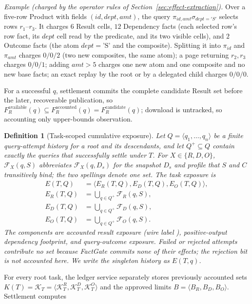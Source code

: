 \documentclass[10pt,journal,compsoc]{IEEEtran}
\newcommand{\system}{FactGate\xspace}
\newcommand{\code}[1]{\texttt{\detokenize{#1}}}
\newcommand{\facts}{\mathcal{F}}
\newcommand{\accounted}{\mathcal{K}}
\newtheorem{definition}{Definition}
\begin{document}
\emph{Example (charged by the operator rules of Section~\ref{sec:effect-extraction}).} Over a five-row Product with fields $(id,dept,amt)$, the
query $\pi_{id,amt}\sigma_{dept='S'}$ selects rows $r_1$--$r_3$. It charges
$6$ Result cells, $12$ Dependency facts (each selected row's row fact, its
$dept$ cell read by the predicate, and its two visible cells), and $2$
Outcome facts (the atom $dept{=}\text{'S'}$ and the composite). Splitting it
into $\pi_{id}$ and $\pi_{amt}$ charges $0/0/2$ (two new composites, the same
atom); a page returning $r_2,r_3$ charges $0/0/1$; adding $amt>5$ charges
one new atom and one composite and no new base facts; an exact replay by the
root or by a delegated child charges $0/0/0$.

For a successful $q$, settlement commits the complete candidate Result set
before the later, recoverable publication, so
$F_R^{\mathrm{available}}(q)\subseteq F_R^{\mathrm{accounted}}(q)
=F_R^{\mathrm{candidate}}(q)$; download is untracked, so accounting only
upper-bounds observation.

\begin{definition}[Task-scoped cumulative exposure]
\label{def:task-exposure}
Let $Q=\langle q_1,\ldots,q_n\rangle$ be a finite query-attempt history for a
root and its descendants, and let $Q^+\subseteq Q$ contain exactly the queries
that successfully settle under $T$. For $X\in\{R,D,O\}$,
$\facts_X(q,S)$ abbreviates $\facts_X(q,D_s)$ for the snapshot $D_s$ and
profile that $S$ and $C$ transitively bind; the two spellings denote one set.
The task exposure is
\begin{equation}
 \begin{aligned}
 E(T,Q)&=\langle E_R(T,Q),E_D(T,Q),E_O(T,Q)\rangle,\\
 E_R(T,Q)&=\bigcup_{q\in Q^+}\facts_R(q,S),\\
 E_D(T,Q)&=\bigcup_{q\in Q^+}\facts_D(q,S),\\
 E_O(T,Q)&=\bigcup_{q\in Q^+}\facts_O(q,S).
 \end{aligned}
 \label{eq:task-exposure}
\end{equation}
The components are accounted result exposure (wire label
\code{release}), positive-output dependency
footprint, and query-outcome exposure. Failed or rejected attempts contribute
no set because \system commits none of their effects; the
rejection bit is not accounted here. We write the singleton history as
$E(T,q)$.
\end{definition}

For every root task, the ledger service separately stores previously accounted
sets $K(T)=\accounted_T=\langle\accounted_T^R,\accounted_T^D,
\accounted_T^O\rangle$ and the approved limits
$B=\langle B_R,B_D,B_O\rangle$. Settlement computes
\end{document}
